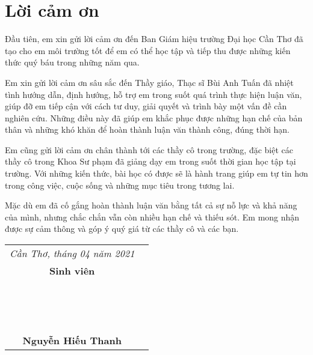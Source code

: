 \chapter*{Lời cảm ơn}

Đầu tiên, em xin gửi lời cảm ơn đến Ban Giám hiệu trường Đại học Cần Thơ đã tạo cho em môi trường tốt để em có thể học tập và tiếp thu được những kiến thức quý báu trong những năm qua.\par
Em xin gửi lời cảm ơn sâu sắc đến Thầy giáo, Thạc sĩ Bùi Anh Tuấn đã nhiệt tình hướng dẫn, định hướng, hỗ trợ em trong suốt quá trình thực hiện luận văn, giúp đỡ em tiếp cận với cách tư duy, giải quyết và trình bày một vấn đề cần nghiên cứu. Những điều này đã giúp em khắc phục được những hạn chế của bản thân và những khó khăn để hoàn thành luận văn thành công, đúng thời hạn.\par
Em cũng gửi lời cảm ơn chân thành tới các thầy cô trong trường, đặc biệt các thầy cô trong Khoa Sư phạm đã giảng dạy em trong suốt thời gian học tập tại trường. Với những kiến thức, bài học có được sẽ là hành trang giúp em tự tin hơn trong công việc, cuộc sống và những mục tiêu trong tương lai.\par
Mặc dù em đã cố gắng hoàn thành luận văn bằng tất cả sự nỗ lực và khả năng của mình, nhưng chắc chắn vẫn còn nhiều hạn chế và thiếu sót. Em mong nhận được sự cảm thông và góp ý quý giá từ các thầy cô và các bạn.\par

\begin{flushright}
\begin{tabular}{Sc}
	\textit{Cần Thơ, tháng 04 năm 2021}\\
	\textbf{Sinh viên}\\
	~\\~\\~\\
	\textbf{Nguyễn Hiếu Thanh}\\
\end{tabular}
\end{flushright}\par
